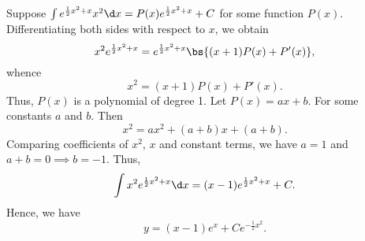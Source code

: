 \begin{solution}
\begin{ppart}
        Suppose $\int e^{\frac12 x^2 + x} x^2 \d x = P(x) e^{\frac12 x^2 + x} + C$ for some function $P(x)$. Differentiating both sides with respect to $x$, we obtain \[x^2 e^{\frac12 x^2 + x} = e^{\frac12 x^2 + x} \bs{(x+1)P(x) + P'(x)},\] whence \[x^2 = (x+1)P(x) + P'(x).\] Thus, $P(x)$ is a polynomial of degree 1. Let $P(x) = ax + b$. For some constants $a$ and $b$. Then \[x^2 = ax^2 + (a+b)x + (a+b).\] Comparing coefficients of $x^2$, $x$ and constant terms, we have $a = 1$ and $a + b = 0 \implies b = -1$. Thus, \[\int x^2 e^{\frac12 x^2 + x} \d x = (x-1)e^{\frac12 x^2 + x} + C.\] Hence, we have \[y = (x-1)e^x + Ce^{-\frac12 x^2}.\]
    \end{ppart}
\end{solution}